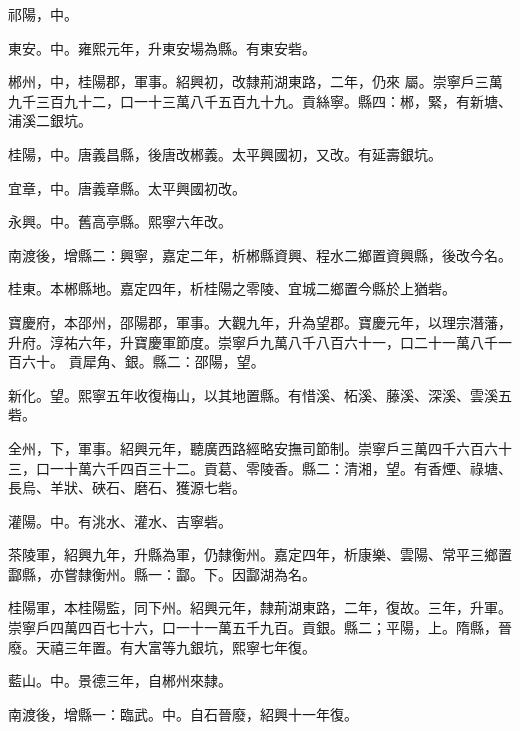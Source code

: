 \begin{pinyinscope}
 祁陽，中。



 東安。中。雍熙元年，升東安場為縣。有東安砦。



 郴州，中，桂陽郡，軍事。紹興初，改隸荊湖東路，二年，仍來
 屬。崇寧戶三萬九千三百九十二，口一十三萬八千五百九十九。貢絲寧。縣四：郴，緊，有新塘、浦溪二銀坑。



 桂陽，中。唐義昌縣，後唐改郴義。太平興國初，又改。有延壽銀坑。



 宜章，中。唐義章縣。太平興國初改。



 永興。中。舊高亭縣。熙寧六年改。



 南渡後，增縣二：興寧，嘉定二年，析郴縣資興、程水二鄉置資興縣，後改今名。



 桂東。本郴縣地。嘉定四年，析桂陽之零陵、宜城二鄉置今縣於上猶砦。



 寶慶府，本邵州，邵陽郡，軍事。大觀九年，升為望郡。寶慶元年，以理宗潛藩，升府。淳祐六年，升寶慶軍節度。崇寧戶九萬八千八百六十一，口二十一萬八千一百六十。
 貢犀角、銀。縣二：邵陽，望。



 新化。望。熙寧五年收復梅山，以其地置縣。有惜溪、柘溪、藤溪、深溪、雲溪五砦。



 全州，下，軍事。紹興元年，聽廣西路經略安撫司節制。崇寧戶三萬四千六百六十三，口一十萬六千四百三十二。貢葛、零陵香。縣二：清湘，望。有香煙、祿塘、長烏、羊狀、硤石、磨石、獲源七砦。



 灌陽。中。有洮水、灌水、吉寧砦。



 茶陵軍，紹興九年，升縣為軍，仍隸衡州。嘉定四年，析康樂、雲陽、常平三鄉置酃縣，亦嘗隸衡州。縣一：酃。下。因酃湖為名。



 桂陽軍，本桂陽監，同下州。紹興元年，隸荊湖東路，二年，復故。三年，升軍。崇寧戶四萬四百七十六，口一十一萬五千九百。貢銀。縣二；平陽，上。隋縣，晉廢。天禧三年置。有大富等九銀坑，熙寧七年復。



 藍山。中。景德三年，自郴州來隸。



 南渡後，增縣一：臨武。中。自石晉廢，紹興十一年復。




\end{pinyinscope}
